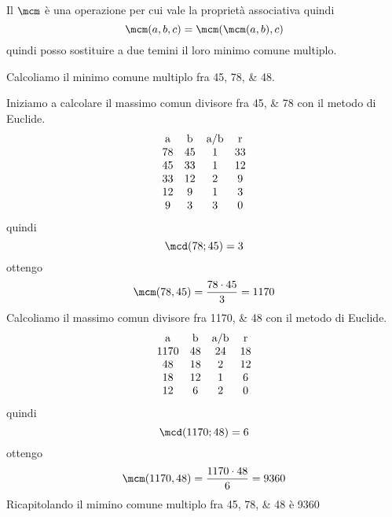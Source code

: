   Il $\mcm$ è una operazione per cui vale la proprietà associativa quindi\[\mcm(a,b,c)=\mcm(\mcm(a,b),c) \] quindi posso sostituire a due temini il loro minimo comune multiplo.
  \begin{esempiot}{}{}
  Calcoliamo il minimo comune multiplo fra \numlist{45;78;48}. 
    \end{esempiot}
  Iniziamo a calcolare il massimo comun divisore fra \numlist{45;78} con il metodo di Euclide.
     \[
       	   \begin{array}{cccc}
       	   $a$&$b$&$a/b$&$r$\\
       	   	78 & 45 & 1 & 33\\
       	   	45 & 33 & 1 & 12\\
       	   	33 & 12 & 2 & 9\\
			12 & 9 & 1 & 3\\
			9 & 3 & 3 & 0
       	    \end{array} 
       	     \]
       	quindi \[\mcd(78;45)=3\]
       		ottengo
       	  \[ \mcm(78,45)=\dfrac{78\cdot 45}{3}=1170\]
     Calcoliamo il massimo comun divisore fra \numlist{1170;48} con il metodo di Euclide.   	  
      \[
            	   \begin{array}{cccc}
            	   $a$&$b$&$a/b$&$r$\\
            	   	1170 & 48 & 24 & 18\\
            	   	48 & 18 & 2 & 12\\
            	   	18 & 12 & 1 & 6\\
     				12 & 6 & 2 & 0
            	    \end{array} 
            	     \]
            	quindi \[\mcd(1170;48)=6\]
            		ottengo
            	  \[ \mcm(1170,48)=\dfrac{1170\cdot 48}{6}=9360\]
      Ricapitolando il mimino comune multiplo fra \numlist{45;78;48} è \num{9360}
